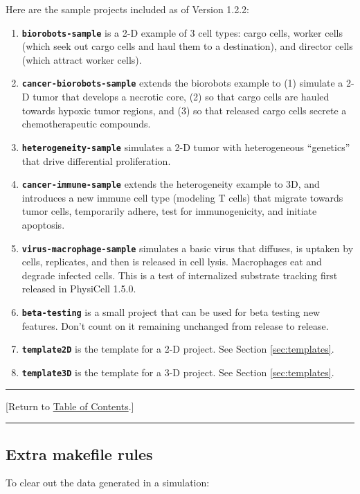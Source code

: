 \documentclass[12pt]{article}
\newcommand{\smallcode}[1]{\textbf{\texttt{#1}}}
\newcommand{\TOClink}{\begin{center}\hrule\vskip-5pt\phantom{.}\hfill[Return to \hyperlink{TOC}{Table of Contents}.]\hfill\phantom{.}\vskip3pt\hrule\end{center}}
\begin{document}
Here are the sample projects included as of Version 1.2.2: 
\begin{enumerate}
\item 
\smallcode{biorobots-sample} is a 2-D example of 3 cell types: cargo cells, worker cells (which seek out cargo cells and 
haul them to a destination), and director cells (which attract worker cells). 

\item 
\smallcode{cancer-biorobots-sample} extends the biorobots example to (1) simulate a 2-D tumor that develops a necrotic 
core, (2) so that cargo cells are hauled towards hypoxic tumor regions, and (3) so that released cargo cells secrete 
a chemotherapeutic compounds. 

\item
\smallcode{heterogeneity-sample} simulates a 2-D tumor with heterogeneous ``genetics'' that drive differential proliferation. 

\item 
\smallcode{cancer-immune-sample} extends the heterogeneity example to 3D, and introduces a new immune 
cell type (modeling T cells) that migrate towards tumor cells, temporarily adhere, test for immunogenicity, 
and initiate apoptosis. 

\item 
\smallcode{virus-macrophage-sample} simulates a basic virus that diffuses, is uptaken by cells, replicates, 
and then is released in cell lysis. Macrophages eat and degrade infected cells. This is a test of internalized 
substrate tracking first released in PhysiCell 1.5.0. 

\item 
\smallcode{beta-testing} is a small project that can be used for beta testing new features. Don't count on 
it remaining unchanged from release to release. 

\item 
\smallcode{template2D} is the template for a 2-D project. See Section \ref{sec:templates}. 

\item 
\smallcode{template3D} is the template for a 3-D project. See Section \ref{sec:templates}. 
\end{enumerate}

\TOClink 

\subsection{Extra makefile rules}
\label{sec:makefiles}
To clear out the data generated in a simulation: 
\end{document}
